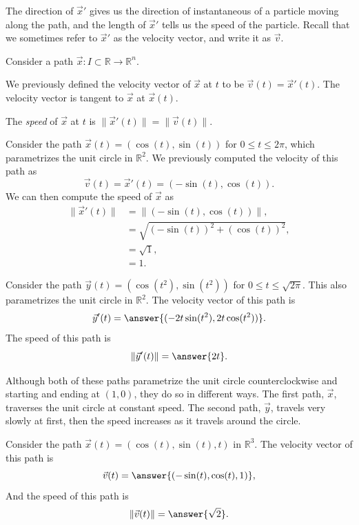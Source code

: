 \documentclass{ximera}
\begin{document}
The direction of $\vec{x}'$ gives us the direction of instantaneous of a particle moving along the path, and the length of $\vec{x}'$ tells us the speed of the particle. Recall that we sometimes refer to $\vec{x}'$ as the velocity vector, and write it as $\vec{v}$.

\begin{definition}
Consider a path $\vec{x}:I\subset\mathbb{R}\rightarrow\mathbb{R}^n$.

We previously defined the velocity vector of $\vec{x}$ at $t$ to be $\vec{v}(t) = \vec{x}'(t)$. The velocity vector is tangent to $\vec{x}$ at $\vec{x}(t)$.

The \emph{speed} of $\vec{x}$ at $t$ is $\|\vec{x}'(t)\| = \|\vec{v}(t)\|$.
\end{definition}

\begin{example}
Consider the path $\vec{x}(t) = (\cos(t), \sin(t))$ for $0\leq t \leq 2\pi$, which parametrizes the unit circle in $\mathbb{R}^2$. We previously computed the velocity of this path as
\[
\vec{v}(t) = \vec{x}'(t) = (-\sin(t), \cos(t)).
\]
We can then compute the speed of $\vec{x}$ as
\begin{align*}
\|\vec{x}'(t)\| &= \|(-\sin(t), \cos(t))\|,\\
&= \sqrt{(-\sin(t))^2 + (\cos(t))^2},\\
& = \sqrt{1},\\
& = 1.
\end{align*}

Consider the path $\vec{y}(t) = (\cos(t^2), \sin(t^2))$ for $0\leq t\leq \sqrt{2\pi}$. This also parametrizes the unit circle in $\mathbb{R}^2$. The velocity vector of this path is
\[
\vec{y}'(t) = \answer{(-2t\sin(t^2), 2t\cos(t^2))}.
\]
The speed of this path is
\[
\|\vec{y}'(t)\| = \answer{2t}.
\]

Although both of these paths parametrize the unit circle counterclockwise and starting and ending at $(1,0)$, they do so in different ways. The first path, $\vec{x}$, traverses the unit circle at constant speed. The second path, $\vec{y}$, travels very slowly at first, then the speed increases as it travels around the circle.
\end{example}

\begin{example}
Consider the path $\vec{x}(t)=(\cos(t),\sin(t),t)$ in $\mathbb{R}^3$. The velocity vector of this path is
\[
\vec{v}(t) = \answer{(-\sin(t),\cos(t),1)},
\]
And the speed of this path is
\[
\|\vec{v}(t)\| = \answer{\sqrt{2}}.
\]
\end{example}
\end{document}
